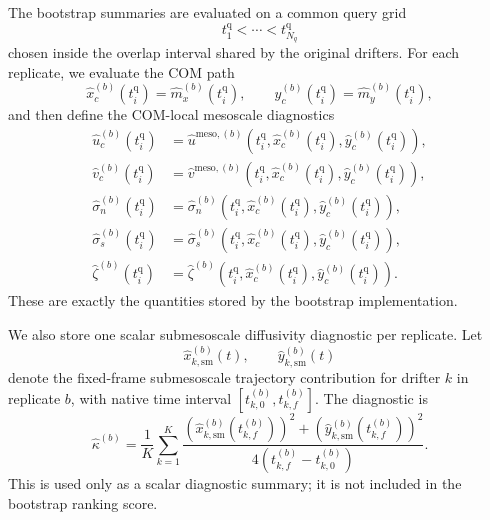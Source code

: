 \documentclass{article}
\begin{document}
The bootstrap summaries are evaluated on a common query grid
\begin{equation}
t_1^{\mathrm{q}} < \cdots < t_{N_q}^{\mathrm{q}}
\end{equation}
chosen inside the overlap interval shared by the original drifters. For
each replicate, we evaluate the COM path
\begin{equation}
\hat{x}_c^{(b)}(t_i^{\mathrm{q}})=\hat{m}_x^{(b)}(t_i^{\mathrm{q}}),
\qquad
\hat{y}_c^{(b)}(t_i^{\mathrm{q}})=\hat{m}_y^{(b)}(t_i^{\mathrm{q}}),
\end{equation}
and then define the COM-local mesoscale diagnostics
\begin{align}
\hat{u}_c^{(b)}(t_i^{\mathrm{q}})
&=
\hat{u}^{\mathrm{meso},(b)}\!\left(
t_i^{\mathrm{q}},
\hat{x}_c^{(b)}(t_i^{\mathrm{q}}),
\hat{y}_c^{(b)}(t_i^{\mathrm{q}})
\right),
\\
\hat{v}_c^{(b)}(t_i^{\mathrm{q}})
&=
\hat{v}^{\mathrm{meso},(b)}\!\left(
t_i^{\mathrm{q}},
\hat{x}_c^{(b)}(t_i^{\mathrm{q}}),
\hat{y}_c^{(b)}(t_i^{\mathrm{q}})
\right),
\\
\hat{\sigma}_n^{(b)}(t_i^{\mathrm{q}})
&=
\hat{\sigma}_n^{(b)}\!\left(
t_i^{\mathrm{q}},
\hat{x}_c^{(b)}(t_i^{\mathrm{q}}),
\hat{y}_c^{(b)}(t_i^{\mathrm{q}})
\right),
\\
\hat{\sigma}_s^{(b)}(t_i^{\mathrm{q}})
&=
\hat{\sigma}_s^{(b)}\!\left(
t_i^{\mathrm{q}},
\hat{x}_c^{(b)}(t_i^{\mathrm{q}}),
\hat{y}_c^{(b)}(t_i^{\mathrm{q}})
\right),
\\
\hat{\zeta}^{(b)}(t_i^{\mathrm{q}})
&=
\hat{\zeta}^{(b)}\!\left(
t_i^{\mathrm{q}},
\hat{x}_c^{(b)}(t_i^{\mathrm{q}}),
\hat{y}_c^{(b)}(t_i^{\mathrm{q}})
\right).
\end{align}
These are exactly the quantities stored by the bootstrap implementation.

We also store one scalar submesoscale diffusivity diagnostic per
replicate. Let
\begin{equation}
\hat{x}_{k,\mathrm{sm}}^{(b)}(t), \qquad \hat{y}_{k,\mathrm{sm}}^{(b)}(t)
\end{equation}
denote the fixed-frame submesoscale trajectory contribution for drifter
$k$ in replicate $b$, with native time interval
$[t_{k,0}^{(b)}, t_{k,f}^{(b)}]$. The diagnostic is
\begin{equation}
\hat{\kappa}^{(b)}
=
\frac{1}{K}
\sum_{k=1}^{K}
\frac{
\left(\hat{x}_{k,\mathrm{sm}}^{(b)}(t_{k,f}^{(b)})\right)^2
+
\left(\hat{y}_{k,\mathrm{sm}}^{(b)}(t_{k,f}^{(b)})\right)^2
}{
4\left(t_{k,f}^{(b)}-t_{k,0}^{(b)}\right)
}.
\end{equation}
This is used only as a scalar diagnostic summary; it is not included in
the bootstrap ranking score.
\end{document}

